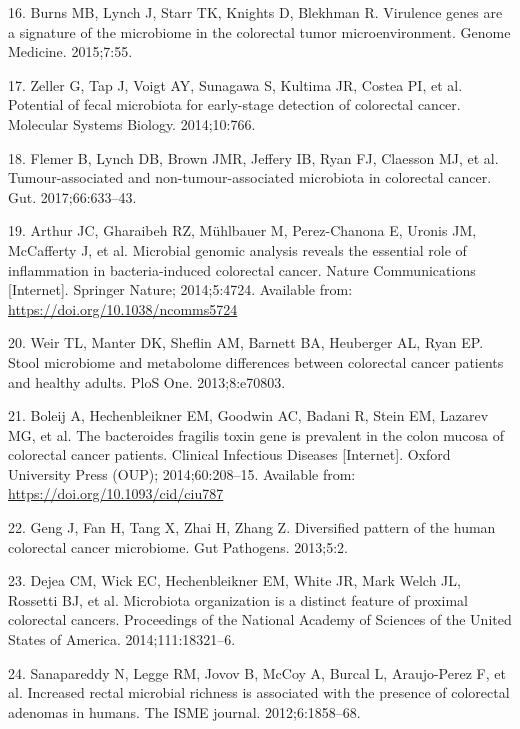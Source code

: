 \documentclass[12pt,]{article}
\begin{document}
\hypertarget{ref-burns_virulence_2015}{}
16. Burns MB, Lynch J, Starr TK, Knights D, Blekhman R. Virulence genes
are a signature of the microbiome in the colorectal tumor
microenvironment. Genome Medicine. 2015;7:55.

\hypertarget{ref-zeller_potential_2014}{}
17. Zeller G, Tap J, Voigt AY, Sunagawa S, Kultima JR, Costea PI, et al.
Potential of fecal microbiota for early-stage detection of colorectal
cancer. Molecular Systems Biology. 2014;10:766.

\hypertarget{ref-flemer_tumour-associated_2017}{}
18. Flemer B, Lynch DB, Brown JMR, Jeffery IB, Ryan FJ, Claesson MJ, et
al. Tumour-associated and non-tumour-associated microbiota in colorectal
cancer. Gut. 2017;66:633--43.

\hypertarget{ref-ecoli_Arthur_2014}{}
19. Arthur JC, Gharaibeh RZ, Mühlbauer M, Perez-Chanona E, Uronis JM,
McCafferty J, et al. Microbial genomic analysis reveals the essential
role of inflammation in bacteria-induced colorectal cancer. Nature
Communications {[}Internet{]}. Springer Nature; 2014;5:4724. Available
from: \url{https://doi.org/10.1038/ncomms5724}

\hypertarget{ref-weir_stool_2013}{}
20. Weir TL, Manter DK, Sheflin AM, Barnett BA, Heuberger AL, Ryan EP.
Stool microbiome and metabolome differences between colorectal cancer
patients and healthy adults. PloS One. 2013;8:e70803.

\hypertarget{ref-bfrag_Boleij_2014}{}
21. Boleij A, Hechenbleikner EM, Goodwin AC, Badani R, Stein EM, Lazarev
MG, et al. The bacteroides fragilis toxin gene is prevalent in the colon
mucosa of colorectal cancer patients. Clinical Infectious Diseases
{[}Internet{]}. Oxford University Press (OUP); 2014;60:208--15.
Available from: \url{https://doi.org/10.1093/cid/ciu787}

\hypertarget{ref-geng_diversified_2013}{}
22. Geng J, Fan H, Tang X, Zhai H, Zhang Z. Diversified pattern of the
human colorectal cancer microbiome. Gut Pathogens. 2013;5:2.

\hypertarget{ref-dejea_microbiota_2014}{}
23. Dejea CM, Wick EC, Hechenbleikner EM, White JR, Mark Welch JL,
Rossetti BJ, et al. Microbiota organization is a distinct feature of
proximal colorectal cancers. Proceedings of the National Academy of
Sciences of the United States of America. 2014;111:18321--6.

\hypertarget{ref-sanapareddy_increased_2012}{}
24. Sanapareddy N, Legge RM, Jovov B, McCoy A, Burcal L, Araujo-Perez F,
et al. Increased rectal microbial richness is associated with the
presence of colorectal adenomas in humans. The ISME journal.
2012;6:1858--68.
\end{document}
